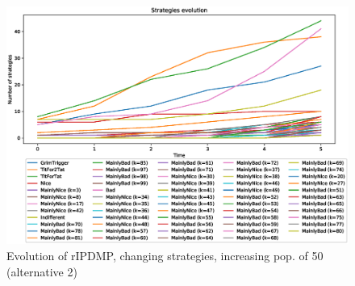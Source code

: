 \documentclass[journal,10pt,twoside]{IEEEtran}
\begin{document}
\begin{figure}[!ht]
    \centering
    \includegraphics[width=.8\columnwidth]{../img/cipdmp-incr/alt2/cipdmp-evolution-increasing-pop-50}
    \caption{Evolution of rIPDMP, changing strategies, increasing pop. of 50 (alternative 2)}
    \label{fig:incrC2}
\end{figure}



\end{document}
